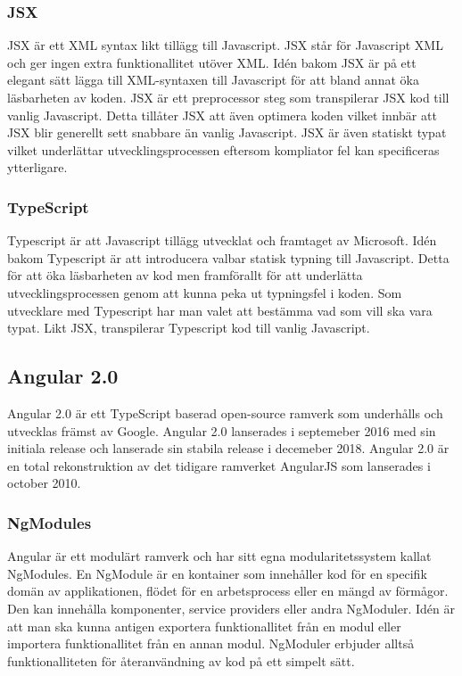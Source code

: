 \subsubsection{JSX}
JSX är ett XML syntax likt tillägg till Javascript. JSX står för Javascript XML och ger ingen extra funktionallitet utöver XML. Idén bakom JSX är på ett elegant sätt lägga till XML-syntaxen till Javascript för att bland annat öka läsbarheten av koden. JSX är ett preprocessor steg som transpilerar JSX kod till vanlig Javascript. Detta tillåter JSX att även optimera koden vilket innbär att JSX blir generellt sett snabbare än vanlig Javascript. JSX är även statiskt typat vilket underlättar utvecklingsprocessen eftersom kompliator fel kan specificeras ytterligare. 


\subsubsection{TypeScript}
Typescript är att Javascript tillägg utvecklat och framtaget av Microsoft. Idén bakom Typescript är att introducera valbar statisk typning till Javascript. Detta för att öka läsbarheten av kod men framförallt för att underlätta utvecklingsprocessen genom att kunna peka ut typningsfel i koden. Som utvecklare med Typescript har man valet att bestämma vad som vill ska vara typat. Likt JSX, transpilerar Typescript kod till vanlig Javascript. 


\subsection{Angular 2.0}
Angular 2.0 är ett TypeScript baserad open-source ramverk som underhålls och utvecklas främst av Google. Angular 2.0 lanserades i septemeber 2016 med sin initiala release och lanserade sin stabila release i decemeber 2018. Angular 2.0 är en total rekonstruktion av det tidigare ramverket AngularJS som lanserades i october 2010. 

\subsubsection{NgModules}
Angular är ett modulärt ramverk och har sitt egna modularitetssystem kallat NgModules. En NgModule är en kontainer som innehåller kod för en specifik domän av applikationen, flödet för en arbetsprocess eller en mängd av förmågor. Den kan innehålla komponenter, service providers eller andra NgModuler. Idén är att man ska kunna antigen exportera funktionallitet från en modul eller importera funktionallitet från en annan modul. NgModuler erbjuder alltså funktionalliteten för återanvändning av kod på ett simpelt sätt. 

